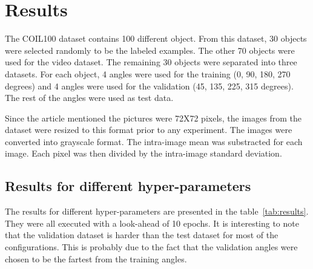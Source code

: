 \section{Results}
The COIL100 dataset contains 100 different object. From this dataset, 30 objects were selected randomly to be the labeled examples. The other 70 objects were used for the video dataset. The remaining 30 objects were separated into three datasets. For each object, 4 angles were used for the training (0, 90, 180, 270 degrees) and 4 angles were used for the validation (45, 135, 225, 315 degrees). The rest of the angles were used as test data.

Since the article mentioned the pictures were 72X72 pixels, the images from the dataset were resized to this format prior to any experiment. The images were converted into grayscale format. The intra-image mean was substracted for each image. Each pixel was then divided by the intra-image standard deviation.

\subsection{Results for different hyper-parameters}

The results for different hyper-parameters are presented in the table~\ref{tab:results}. They were all executed with a look-ahead of 10 epochs. It is interesting to note that the validation dataset is harder than the test dataset for most of the configurations. This is probably due to the fact that the validation angles were chosen to be the fartest from the training angles.

